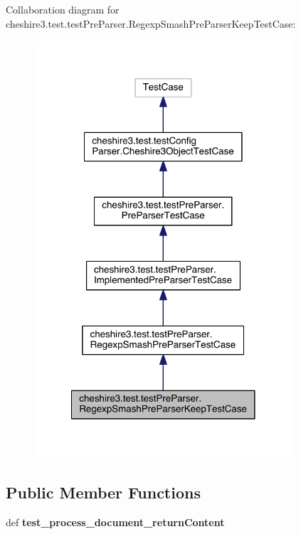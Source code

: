 Collaboration diagram for cheshire3.\-test.\-test\-Pre\-Parser.\-Regexp\-Smash\-Pre\-Parser\-Keep\-Test\-Case\-:
\nopagebreak
\begin{figure}[H]
\begin{center}
\leavevmode
\includegraphics[width=272pt]{classcheshire3_1_1test_1_1test_pre_parser_1_1_regexp_smash_pre_parser_keep_test_case__coll__graph}
\end{center}
\end{figure}
\subsection*{Public Member Functions}
\begin{DoxyCompactItemize}
\item 
\hypertarget{classcheshire3_1_1test_1_1test_pre_parser_1_1_regexp_smash_pre_parser_keep_test_case_a11316329a926a49d5ee8a64f41689a00}{def {\bfseries test\-\_\-process\-\_\-document\-\_\-return\-Content}}\label{classcheshire3_1_1test_1_1test_pre_parser_1_1_regexp_smash_pre_parser_keep_test_case_a11316329a926a49d5ee8a64f41689a00}

\end{DoxyCompactItemize}
